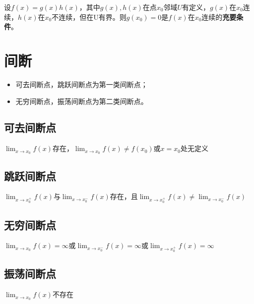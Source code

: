设\(f(x) = g(x)h(x)\)，其中\(g(x), h(x)\)在点\(x_0\)邻域\(U\)有定义，\(g(x)\)在\(x_0\)连续，\(h(x)\)在\(x_0\)不连续，但在U有界。则\(g(x_0) = 0\)是\(f(x)\)在\(x_0\)连续的\textbf{充要条件}。


\section{间断}
\begin{itemize}
    \item 可去间断点，跳跃间断点为第一类间断点；
    \item 无穷间断点，振荡间断点为第二类间断点。
\end{itemize}

\subsection{可去间断点}
\(\displaystyle \lim_{x \to x_0}f(x)\)存在，\(\displaystyle \lim_{x \to x_0}f(x) \neq f(x_0)\)或\(x = x_0\)处无定义

\subsection{跳跃间断点}
\(\displaystyle \lim_{x \to x_0^+}f(x)\)与\(\displaystyle \lim_{x \to x_0^-}f(x)\)存在，且\(\displaystyle \lim_{x \to x_0^+}f(x) \neq \displaystyle \lim_{x \to x_0^-}f(x)\)

\subsection{无穷间断点}
\(\displaystyle \lim_{x \to x_0}f(x) = \infty\)或\(\displaystyle \lim_{x \to x_0^-}f(x) = \infty\)或\(\displaystyle \lim_{x \to x_0^+}f(x) = \infty\)

\subsection{振荡间断点}
\(\displaystyle \lim_{x \to x_0}f(x)\)不存在






